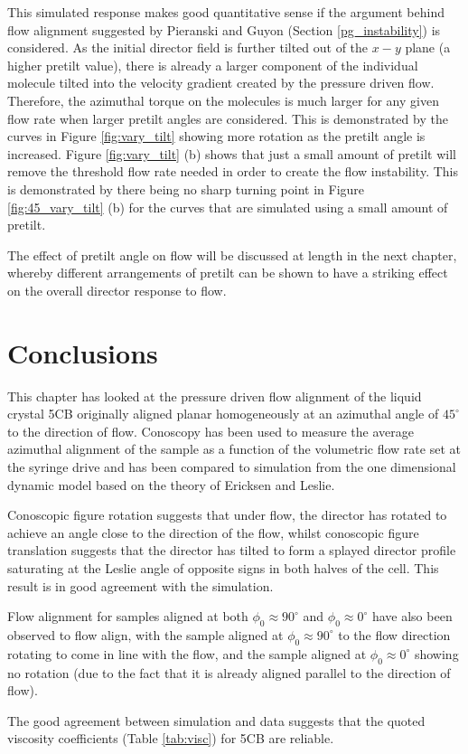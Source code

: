 This simulated response makes good quantitative sense if the argument behind flow alignment suggested by Pieranski and Guyon \cite{Pieranski1974} (Section \ref{pg_instability}) is considered. As the initial director field is further tilted out of the $x-y$ plane (a higher pretilt value), there is already a larger component of the individual molecule tilted into the velocity gradient created by the pressure driven flow. Therefore, the azimuthal torque on the molecules is much larger for any given flow rate when larger pretilt angles are considered. This is demonstrated by the curves in Figure \ref{fig:vary_tilt} showing more rotation as the pretilt angle is increased. Figure \ref{fig:vary_tilt} (b) shows that just a small amount of pretilt will remove the threshold flow rate needed in order to create the flow instability. This is demonstrated by there being no sharp turning point in Figure \ref{fig:45_vary_tilt} (b) for the curves that are simulated using a small amount of pretilt.

The effect of pretilt angle on flow will be discussed at length in the next chapter, whereby different arrangements of pretilt can be shown to have a striking effect on the overall director response to flow.

\section{Conclusions}
This chapter has looked at the pressure driven flow alignment of the liquid crystal 5CB originally aligned planar homogeneously at an azimuthal angle of $45^{\circ}$ to the direction of flow. Conoscopy has been used to measure the average azimuthal alignment of the sample as a function of the volumetric flow rate set at the syringe drive and has been compared to simulation from the one dimensional dynamic model based on the theory of Ericksen and Leslie. 

Conoscopic figure rotation suggests that under flow, the director has rotated to achieve an angle close to the direction of the flow, whilst conoscopic figure translation suggests that the director has tilted to form a splayed director profile saturating at the Leslie angle of opposite signs in both halves of the cell. This result is in good agreement with the simulation.

Flow alignment for samples aligned at both $\phi_0\approx90^{\circ}$ and $\phi_0\approx0^{\circ}$ have also been observed to flow align, with the sample aligned at $\phi_0\approx90^{\circ}$ to the flow direction rotating to come in line with the flow, and the sample aligned at $\phi_0\approx0^{\circ}$ showing no rotation (due to the fact that it is already aligned parallel to the direction of flow).

The good agreement between simulation and data suggests that the quoted viscosity coefficients (Table \ref{tab:visc}) for 5CB are reliable.
